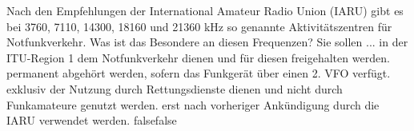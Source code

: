     {Nach den Empfehlungen der International Amateur Radio Union (IARU) gibt es bei 3760, 7110, 14300, 18160 und 21360 kHz so genannte Aktivitätszentren für Notfunkverkehr. Was ist das Besondere an diesen Frequenzen? Sie sollen ...}
    {in der ITU-Region 1 dem Notfunkverkehr dienen und für diesen freigehalten werden.}
    {permanent abgehört werden, sofern das Funkgerät über einen 2. VFO verfügt.}
    {exklusiv der Nutzung durch Rettungsdienste dienen und nicht durch Funkamateure genutzt werden.}
    {erst nach vorheriger Ankündigung durch die IARU verwendet werden.}
    {false}{false}